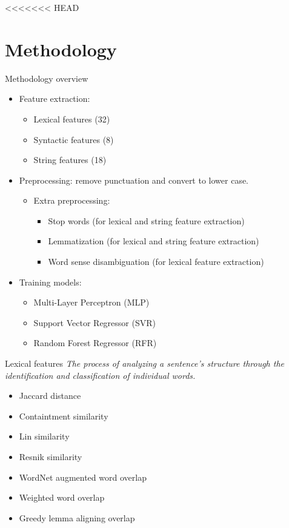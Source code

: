 <<<<<<< HEAD
\section{Methodology}
\frame{\tableofcontents[currentsection]}

\begin{frame}{Methodology overview}
    \begin{itemize}
        \item Feature extraction:
        \begin{itemize}
            \item Lexical features (32)
            \item Syntactic features (8)
            \item String features (18)
        \end{itemize}
        \vspace{0.4cm}
        \item Preprocessing: remove punctuation and convert to lower case.
        \begin{itemize}
            \item Extra preprocessing:
            \begin{itemize}
                \item Stop words (for lexical and string feature extraction)
                \item Lemmatization (for lexical and string feature extraction)
                \item Word sense disambiguation (for lexical feature extraction)
            \end{itemize}
        \end{itemize}
        \vspace{0.4cm}
        \item Training models:
        \begin{itemize}
            \item Multi-Layer Perceptron (MLP)
            \item Support Vector Regressor (SVR)
            \item Random Forest Regressor (RFR)
        \end{itemize} 
    \end{itemize}
\end{frame}


\begin{frame}{Lexical features}
\textit{The process of analyzing a sentence's structure through the identification and classification of individual words.}
\vspace{0.5cm}
\begin{itemize}
    \item Jaccard distance 
    \item Containtment similarity 
    \item Lin similarity 
    \item Resnik similarity 
    \item WordNet augmented word overlap 
    \item Weighted word overlap 
    \item Greedy lemma aligning overlap
\end{itemize}
\end{frame}

